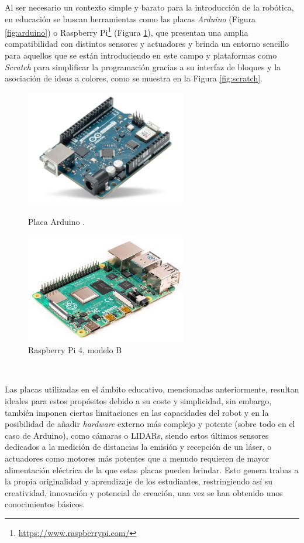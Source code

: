 Al ser necesario un contexto simple y barato para la introducción de la
robótica, en educación se buscan herramientas como las placas \textit{Arduino}
(Figura \ref{fig:arduino}) o Raspberry Pi\footnote{
\url{https://www.raspberrypi.com/}} (Figura \ref{fig:raspberry_pi}), que
presentan una amplia compatibilidad con distintos sensores y actuadores y brinda
un entorno sencillo para aquellos que se están introduciendo en este campo y
plataformas como \textit{Scratch} para simplificar la programación gracias a su
interfaz de bloques y la asociación de ideas a colores, como se muestra en la
Figura \ref{fig:scratch}.

\begin{figure}[h!]
  \centering
  \begin{minipage}{0.45\textwidth}
    \centering
    \includegraphics[width=7cm]{figs/arduino}
    \caption{Placa Arduino \cite{arduino_uno}.}
    \label{fig:arduino}
  \end{minipage}
  \hfill
  \begin{minipage}{0.45\textwidth}
    \centering
    \includegraphics[width=7cm]{figs/raspberry_pi_4b}
    \caption{Raspberry Pi 4, modelo B \cite{raspberry_pi_4b}}
    \label{fig:raspberry_pi}
  \end{minipage}
\end{figure}\

Las placas utilizadas en el ámbito educativo, mencionadas anteriormente,
resultan ideales para estos propósitos debido a su coste y simplicidad, sin
embargo, también imponen ciertas limitaciones en las capacidades del robot y en
la posibilidad de añadir \textit{hardware} externo más complejo y potente (sobre
todo en el caso de Arduino), como cámaras o LIDARs, siendo estos últimos
sensores dedicados a la medición de distancias la emisión y recepción de un
láser, o actuadores como motores más potentes que a menudo requieren de mayor
alimentación eléctrica de la que estas placas pueden brindar.
Esto genera trabas a la propia originalidad y aprendizaje de los estudiantes,
restringiendo así su creatividad, innovación y potencial de creación, una vez se
han obtenido unos conocimientos básicos.

